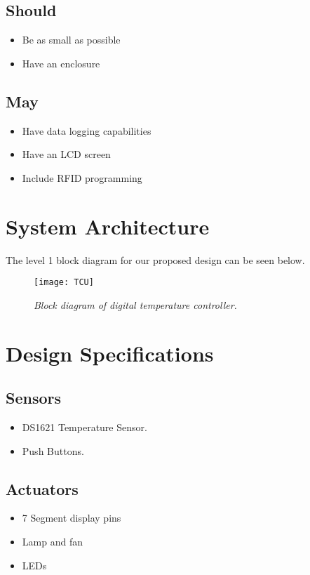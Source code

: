 \documentclass[11pt]{article}
\begin{document}
\subsection*{Should}

\begin{itemize}

    \item Be as small as possible
    \item Have an enclosure

\end{itemize}
		
\subsection*{May}

\begin{itemize}

    \item Have data logging capabilities
    \item Have an LCD screen
    \item Include RFID programming

\end{itemize}

\section*{System Architecture}
The level 1 block diagram for our proposed design can be seen below.
	
	\begin{figure}[H]
	\centering
	\texttt{[image: TCU]}
		\caption{\textit{Block diagram of digital temperature controller.}}
	\end{figure}

\section*{Design Specifications}

\subsection*{Sensors}
\begin{itemize}
    \item DS1621 Temperature Sensor.
    \item Push Buttons.

\end{itemize}

\subsection*{Actuators}
\begin{itemize}
    \item 7 Segment display pins
 \item Lamp and fan
\item LEDs
\end{itemize}
\end{document}
